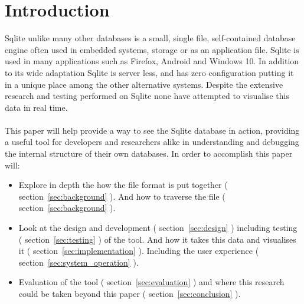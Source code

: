 \section{Introduction}
\label{sec:introduction}
Sqlite unlike many other databases is a small, single file, self-contained database engine often used in embedded systems, storage or as an application file. Sqlite is used in many applications such as Firefox, Android and Windows 10. In addition to its wide adaptation Sqlite is server less, and has zero configuration putting it in a unique place among the other alternative systems. Despite the extensive research and testing performed on Sqlite none have attempted to visualise this data in real time. \\\\
This paper will  help provide a way to see the Sqlite database in action, providing a useful tool for developers and researchers alike in understanding and debugging the internal structure of their own databases. In order to accomplish this paper will: 

\begin{itemize}  

\item Explore in depth the how the file format is put together ( section~\ref{sec:background} ). And how to traverse the file ( section~\ref{sec:background} ).

\item Look at the design and development ( section~\ref{sec:design}  ) including testing ( section~\ref{sec:testing} ) of the tool. And how it takes this data and visualises it ( section~\ref{sec:implementation} ). Including the user experience ( section~\ref{sec:system_operation} ).

\item Evaluation of the tool ( section~\ref{sec:evaluation} ) and where this research could be taken beyond this paper ( section~\ref{sec:conclusion} ).

\end{itemize}  